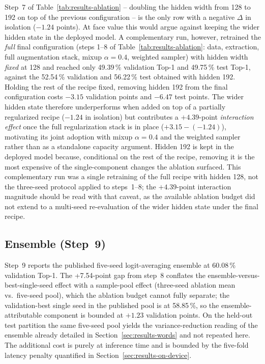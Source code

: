 Step~7 of Table~\ref{tab:results-ablation} -- doubling the hidden width
from 128 to 192 on top of the previous configuration -- is the only
row with a negative $\Delta$ in isolation ($-1.24$ points). At face value
this would argue against keeping the wider hidden state in the deployed
model. A complementary run, however, retrained the
\emph{full} final configuration (steps 1--8 of
Table~\ref{tab:results-ablation}: data, extraction, full augmentation
stack, mixup $\alpha = 0.4$, weighted sampler) with hidden width \emph{fixed}
at 128 and reached only 49.39\,\% validation Top-1 and 49.75\,\% test
Top-1, against the 52.54\,\% validation and 56.22\,\% test obtained
with hidden 192. Holding the rest of the recipe fixed, removing
hidden 192 from the final configuration costs $-3.15$ validation
points and $-6.47$ test points. The wider hidden state therefore
underperforms when added on top of a partially regularized recipe
($-1.24$ in isolation) but contributes a $+4.39$-point
\emph{interaction effect} once the full regularization stack is in
place ($+3.15 - (-1.24)$), motivating its joint adoption with mixup
$\alpha = 0.4$ and the weighted sampler rather than as a standalone
capacity argument. Hidden 192 is kept in the deployed model because,
conditional on the rest of the recipe, removing it is the most
expensive of the single-component changes the ablation surfaced.
This complementary run was a single retraining of the full recipe
with hidden 128, not the three-seed protocol applied to steps~1--8;
the $+4.39$-point interaction magnitude should be read with that
caveat, as the available ablation budget did not extend to a
multi-seed re-evaluation of the wider hidden state under the final
recipe.

\subsection{Ensemble (Step~9)}
\label{sec:results-ablation-ensemble}

Step~9 reports the published five-seed logit-averaging ensemble at
60.08\,\% validation Top-1. The +7.54-point gap from step~8 conflates
the ensemble-versus-best-single-seed effect with a sample-pool effect
(three-seed ablation mean vs.\ five-seed pool), which the ablation
budget cannot fully separate; the validation-best single seed in the
published pool is at 58.85\,\%, so the ensemble-attributable
component is bounded at $+1.23$ validation points. On the held-out
test partition the same five-seed pool yields the variance-reduction
reading of the ensemble already detailed in
Section~\ref{sec:results-words} and not repeated here. The additional
cost is purely at inference time and is bounded by the five-fold
latency penalty quantified in Section~\ref{sec:results-on-device}.

